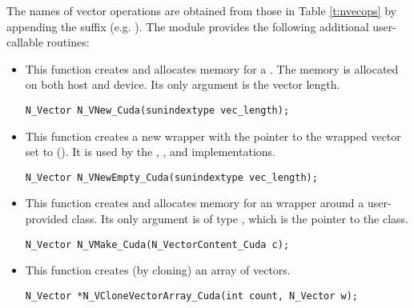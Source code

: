 The names of vector operations are obtained from those in 
Table \ref{t:nvecops} by appending the suffix  (e.g. ).
The module {\nveccuda}  provides the following additional user-callable routines:
\begin{itemize}

  

\item {}
 
  This function creates and allocates memory for a {\cuda} .
  The memory is allocated on both host and device. Its only argument is the 
  vector length. 

\begin{verbatim}
N_Vector N_VNew_Cuda(sunindextype vec_length);
\end{verbatim}

  

\item {}
 
  This function creates a new {\nvector} wrapper with the pointer to
  the wrapped {\cuda} vector set to (). It is used by the 
  , , and  
  implementations. 

\begin{verbatim}
N_Vector N_VNewEmpty_Cuda(sunindextype vec_length);
\end{verbatim}

  

\item {}
  
  This function creates and allocates memory for an {\nveccuda}
  wrapper around a user-provided  class. 
  Its only argument is of type , which
  is the pointer to the class.

\begin{verbatim}
N_Vector N_VMake_Cuda(N_VectorContent_Cuda c);
\end{verbatim}



\item {}
 
  This function creates (by cloning) an array of  {\nveccuda} vectors.
 
\begin{verbatim}
N_Vector *N_VCloneVectorArray_Cuda(int count, N_Vector w);
\end{verbatim}


\end{itemize}
